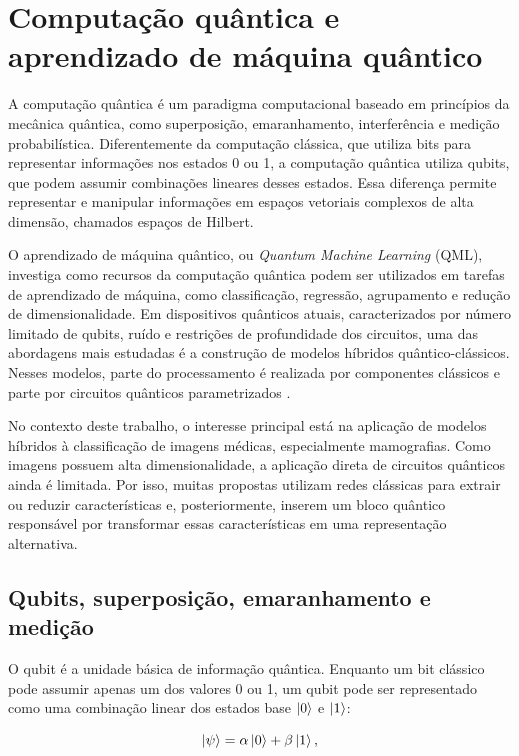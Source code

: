 \documentclass[
    12pt,
    openright,
    oneside,
    a4paper,
    english,
    brazil
]{abntex2}
\begin{document}
\section{Computação quântica e aprendizado de máquina quântico}

A computação quântica é um paradigma computacional baseado em princípios da mecânica quântica, como superposição, emaranhamento, interferência e medição probabilística. Diferentemente da computação clássica, que utiliza bits para representar informações nos estados 0 ou 1, a computação quântica utiliza qubits, que podem assumir combinações lineares desses estados. Essa diferença permite representar e manipular informações em espaços vetoriais complexos de alta dimensão, chamados espaços de Hilbert.

O aprendizado de máquina quântico, ou \textit{Quantum Machine Learning} (QML), investiga como recursos da computação quântica podem ser utilizados em tarefas de aprendizado de máquina, como classificação, regressão, agrupamento e redução de dimensionalidade. Em dispositivos quânticos atuais, caracterizados por número limitado de qubits, ruído e restrições de profundidade dos circuitos, uma das abordagens mais estudadas é a construção de modelos híbridos quântico-clássicos. Nesses modelos, parte do processamento é realizada por componentes clássicos e parte por circuitos quânticos parametrizados \cite{biamonte2017qml,preskill2018nisq,cerezo2021variational}.

No contexto deste trabalho, o interesse principal está na aplicação de modelos híbridos à classificação de imagens médicas, especialmente mamografias. Como imagens possuem alta dimensionalidade, a aplicação direta de circuitos quânticos ainda é limitada. Por isso, muitas propostas utilizam redes clássicas para extrair ou reduzir características e, posteriormente, inserem um bloco quântico responsável por transformar essas características em uma representação alternativa.

\subsection{Qubits, superposição, emaranhamento e medição}

O qubit é a unidade básica de informação quântica. Enquanto um bit clássico pode assumir apenas um dos valores 0 ou 1, um qubit pode ser representado como uma combinação linear dos estados base \(\ket{0}\) e \(\ket{1}\):

\[
\ket{\psi} = \alpha\ket{0} + \beta\ket{1},
\]
\end{document}
